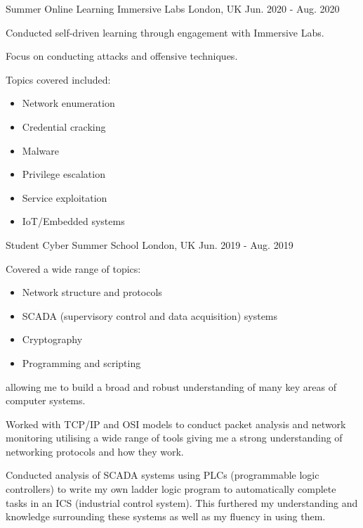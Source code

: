 \begin{cventries}
\cventry
{Summer Online Learning} %
{Immersive Labs} %
{London, UK} %
{Jun. 2020 - Aug. 2020} %
{ %
\begin{cvitems}
\item {Conducted self-driven learning through engagement with Immersive Labs.}
\item {Focus on conducting attacks and offensive techniques.}
\item {Topics covered included:}
\begin{multicols}{3}
\begin{itemize}
    \item Network enumeration
    \item Credential cracking
    \item Malware
    \item Privilege escalation
    \item Service exploitation
    \item IoT/Embedded systems
\end{itemize}
\end{multicols}
\end{cvitems}
}

\cventry
{Student} %
{Cyber Summer School} %
{London, UK} %
{Jun. 2019 - Aug. 2019} %
{ %
\begin{cvitems}
\item {Covered a wide range of topics: 
\begin{itemize}
    \item Network structure and protocols
    \item SCADA (supervisory control and data acquisition) systems
    \item Cryptography
    \item Programming and scripting
\end{itemize} 
allowing me to build a broad and robust understanding of many key areas of computer systems.}
\item {Worked with TCP/IP and OSI models to conduct packet analysis and network monitoring utilising a wide range of tools giving me a strong understanding of networking protocols and how they work.}
\item {Conducted analysis of SCADA systems using PLCs (programmable logic controllers) to write my own ladder logic program to automatically complete tasks in an ICS (industrial control system). This furthered my understanding and knowledge surrounding these systems as well as my fluency in using them.}
\end{cvitems}
}


\end{cventries}
